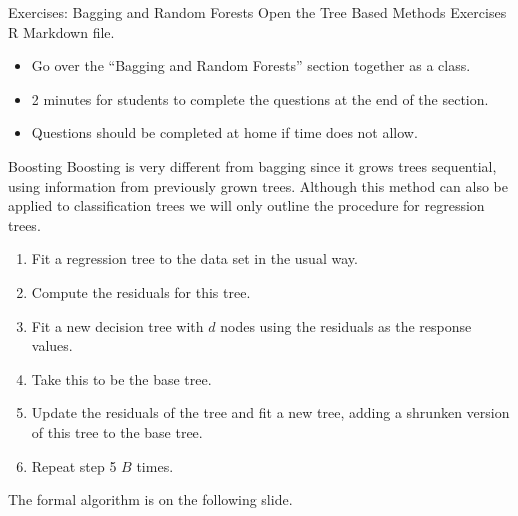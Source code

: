 \documentclass[
  ignorenonframetext,
  aspectratio=169,
]{beamer}
\begin{document}
\begin{frame}{Exercises: Bagging and Random Forests}
\protect\hypertarget{exercises-bagging-and-random-forests}{}
Open the Tree Based Methods Exercises R Markdown file.

\begin{itemize}
\item
  Go over the ``Bagging and Random Forests'' section together as a
  class.
\item
  2 minutes for students to complete the questions at the end of the
  section.
\item
  Questions should be completed at home if time does not allow.
\end{itemize}
\end{frame}

\begin{frame}{Boosting}
\protect\hypertarget{boosting}{}
Boosting is very different from bagging since it grows trees sequential,
using information from previously grown trees. Although this method can
also be applied to classification trees we will only outline the
procedure for regression trees.

\begin{enumerate}
\item
  Fit a regression tree to the data set in the usual way.
\item
  Compute the residuals for this tree.
\item
  Fit a new decision tree with \(d\) nodes using the residuals as the
  response values.
\item
  Take this to be the base tree.
\item
  Update the residuals of the tree and fit a new tree, adding a shrunken
  version of this tree to the base tree.
\item
  Repeat step 5 \(B\) times.
\end{enumerate}

The formal algorithm is on the following slide.
\end{frame}
\end{document}
